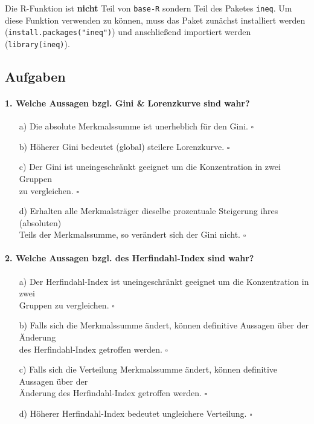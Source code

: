 \documentclass[a4paper]{article}
\newcommand\dangersign[1][2ex]{%
  \renewcommand\stacktype{L}%
  \scaleto{\stackon[1.3pt]{\color{red}$\triangle$}{\tiny !}}{#1}%
}
\begin{document}
\noindent {}

\noindent \dangersign[3ex] Die R-Funktion ist \textbf{nicht} Teil von \texttt{base-R} sondern Teil des Paketes \texttt{ineq}. Um diese Funktion verwenden zu können, muss das Paket zunächst installiert werden (\texttt{install.packages("ineq")}) und anschließend importiert werden (\texttt{library(ineq)}).

\clearpage

\subsection{Aufgaben}

\paragraph{1. Welche Aussagen bzgl. Gini \& Lorenzkurve sind wahr?}

\begin{itemize}
    \item[a)] Die absolute Merkmalssumme ist unerheblich für den Gini. \hfill $\square$
    \item[b)] Höherer Gini bedeutet (global) steilere Lorenzkurve. \hfill $\square$
    \item[c)] Der Gini ist uneingeschränkt geeignet um die Konzentration in zwei Gruppen\\zu vergleichen. \hfill $\square$
    \item[d)] Erhalten alle Merkmalsträger dieselbe prozentuale Steigerung ihres (absoluten)\\Teils der Merkmalssumme, so verändert sich der Gini nicht. \hfill $\square$
\end{itemize}

\paragraph{2. Welche Aussagen bzgl. des Herfindahl-Index sind wahr?}

\begin{itemize}
    \item[a)] Der Herfindahl-Index ist uneingeschränkt geeignet um die Konzentration in zwei\\Gruppen zu vergleichen. \hfill $\square$
    \item[b)] Falls sich die Merkmalssumme ändert, können definitive Aussagen über der Änderung\\des Herfindahl-Index getroffen werden. \hfill $\square$
    \item[c)] Falls sich die Verteilung Merkmalssumme ändert, können definitive Aussagen über der\\Änderung des Herfindahl-Index getroffen werden. \hfill $\square$
    \item[d)] Höherer Herfindahl-Index bedeutet ungleichere Verteilung. \hfill $\square$
\end{itemize}
\end{document}
